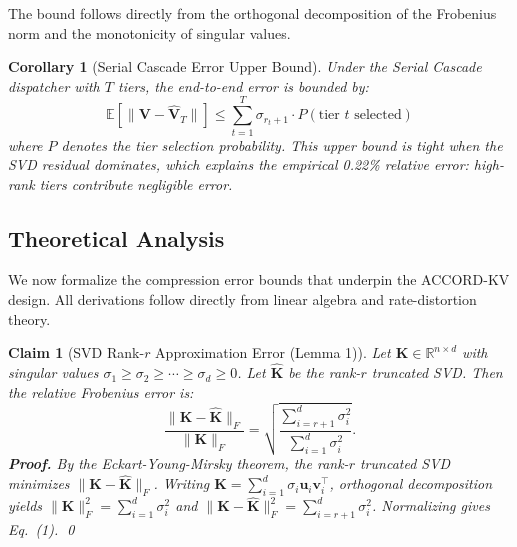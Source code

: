 \documentclass[11pt, a4paper, oneside]{article}
\theoremstyle{myplain}
\newtheorem*{claim*}{Claim}
\theoremstyle{mydefinition}
\theoremstyle{myremark}
\newtheorem*{corol}{Corollary}
\newcommand{\R}{\mathbb{R}}
\begin{document}
The bound follows directly from the orthogonal decomposition of the Frobenius norm and the monotonicity of singular values.

\begin{corol}[Serial Cascade Error Upper Bound]
Under the Serial Cascade dispatcher with $T$ tiers, the end-to-end error is bounded by:
\[
\mathbb{E}[\|\mathbf{V} - \hat{\mathbf{V}}_T\|] \leq \sum_{t=1}^{T} \sigma_{r_t+1} \cdot P(\text{tier } t \text{ selected})
\]
where $P$ denotes the tier selection probability. This upper bound is tight when the SVD residual dominates, which explains the empirical 0.22\% relative error: high-rank tiers contribute negligible error.
\end{corol}

\subsection{Theoretical Analysis}
\label{sec:theory}

We now formalize the compression error bounds that underpin the ACCORD-KV design. All derivations follow directly from linear algebra and rate-distortion theory.

\begin{claim*}[SVD Rank-$r$ Approximation Error (Lemma 1)]
Let $\mathbf{K} \in \R^{n \times d}$ with singular values $\sigma_1 \geq \sigma_2 \geq \cdots \geq \sigma_d \geq 0$. Let $\mathbf{\hat{K}}$ be the rank-$r$ truncated SVD. Then the relative Frobenius error is:
\begin{equation}
    \frac{\|\mathbf{K} - \mathbf{\hat{K}}\|_F}{\|\mathbf{K}\|_F} = \sqrt{\frac{\sum_{i=r+1}^{d} \sigma_i^2}{\sum_{i=1}^{d} \sigma_i^2}}.
    \tag{1}
\end{equation}
\textbf{Proof.} By the Eckart-Young-Mirsky theorem, the rank-$r$ truncated SVD minimizes $\|\mathbf{K} - \mathbf{\hat{K}}\|_F$. Writing $\mathbf{K} = \sum_{i=1}^{d} \sigma_i \mathbf{u}_i \mathbf{v}_i^\top$, orthogonal decomposition yields $\|\mathbf{K}\|_F^2 = \sum_{i=1}^{d} \sigma_i^2$ and $\|\mathbf{K} - \mathbf{\hat{K}}\|_F^2 = \sum_{i=r+1}^{d} \sigma_i^2$. Normalizing gives Eq.\ (1). \qed
\end{claim*}
\end{document}
